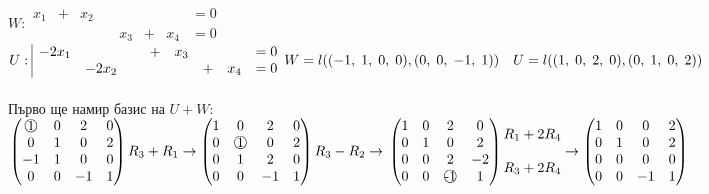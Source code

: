 \documentclass[12pt]{article}
\newcommand*{\mcirc}[1]{\text{\raisebox{.5pt}{\textcircled{\raisebox{-.9pt} {#1}}}}}
\begin{document}
$W : \begin{array}{|lccccccr}
    x_1 & + & x_2 & ~ & ~   & ~ & ~   & = 0 \\
    ~   & ~ & ~   & ~ & x_3 & + & x_4 & = 0
\end{array}$ \quad $U : \begin{array}{|lccccccr}
    -2x_1 & ~     & ~ & + & x_3 & ~ & ~   & = 0 \\
    ~     & -2x_2 & ~ & ~ & ~   & + & x_4 & = 0
\end{array} \\\\
W = l((-1, \; 1, \; 0, \; 0), (0, \; 0, \; -1, \; 1)) \quad U = l((1, \; 0, \; 2, \; 0), (0, \; 1, \; 0, \; 2))$ \\\\

Първо ще намир базис на $U + W$: \\

$\begin{pmatrix}
     \mcirc{1} & 0 &  2 & 0 \\
     0 & 1 &  0 & 2 \\
    -1 & 1 &  0 & 0 \\
     0 & 0 & -1 & 1
\end{pmatrix} R_3 + R_1 \to \begin{pmatrix}
    1 & 0 &  2 & 0 \\
    0 & \mcirc{1} &  0 & 2 \\
    0 & 1 & 2 & 0 \\
    0 & 0 & -1 & 1
\end{pmatrix} R_3 - R_2 \to \\\\\\
\begin{pmatrix}
    1 & 0 &  2 &  0 \\
    0 & 1 &  0 &  2 \\
    0 & 0 &  2 & -2 \\
    0 & 0 & \mcirc{-1} &  1
\end{pmatrix} \begin{matrix}
    R_1 + 2R_4 \\
    \\
    R_3 + 2R_4
\end{matrix} \to \begin{pmatrix}
    1 & 0 &  0 & 2 \\
    0 & 1 &  0 & 2 \\
    0 & 0 &  0 & 0 \\
    0 & 0 & -1 & 1
\end{pmatrix}$ \\\\
\end{document}
